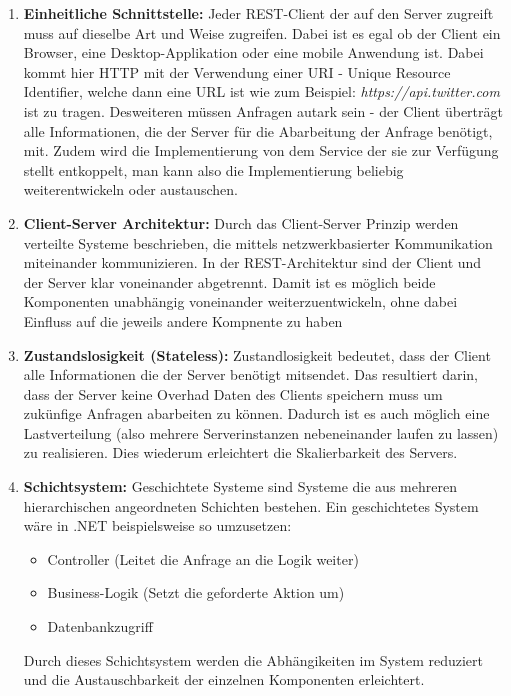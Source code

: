 \documentclass[bachelor, german ]{hgbthesis}
\begin{document}
\begin{enumerate}
    \item \textbf{Einheitliche Schnittstelle: }
    Jeder REST-Client der auf den Server zugreift muss auf dieselbe Art und Weise zugreifen.
    Dabei ist es egal ob der Client ein Browser, eine Desktop-Applikation oder eine mobile Anwendung ist.
    Dabei kommt hier HTTP mit der Verwendung einer URI - Unique Resource Identifier, welche dann eine URL ist wie zum Beispiel: \textit{https://api.twitter.com} ist zu tragen.
    Desweiteren müssen Anfragen autark sein - der Client überträgt alle Informationen, die der Server für die Abarbeitung der Anfrage benötigt, mit.
    Zudem wird die Implementierung von dem Service der sie zur Verfügung stellt entkoppelt, man kann also die Implementierung beliebig weiterentwickeln oder austauschen.
    \item \textbf{Client-Server Architektur: }
    Durch das Client-Server Prinzip werden verteilte Systeme beschrieben, die mittels netzwerkbasierter Kommunikation miteinander kommunizieren.
    In der REST-Architektur sind der Client und der Server klar voneinander abgetrennt.
    Damit ist es möglich beide Komponenten unabhängig voneinander weiterzuentwickeln, ohne dabei Einfluss auf die jeweils andere Kompnente zu haben
    \item \textbf{Zustandslosigkeit (Stateless): }
    Zustandlosigkeit bedeutet, dass der Client alle Informationen die der Server benötigt mitsendet.
    Das resultiert darin, dass der Server keine Overhad Daten des Clients speichern muss um zukünfige Anfragen abarbeiten zu können.
    Dadurch ist es auch möglich eine Lastverteilung (also mehrere Serverinstanzen nebeneinander laufen zu lassen) zu realisieren. Dies wiederum erleichtert die Skalierbarkeit des Servers.
    \item \textbf{Schichtsystem: }
    Geschichtete Systeme sind Systeme die aus mehreren hierarchischen angeordneten Schichten bestehen. Ein geschichtetes System wäre in .NET beispielsweise so umzusetzen:
    \begin{itemize}
        \item Controller (Leitet die Anfrage an die Logik weiter)
        \item Business-Logik (Setzt die geforderte Aktion um)
        \item Datenbankzugriff
    \end{itemize}
    Durch dieses Schichtsystem werden die Abhängikeiten im System reduziert und die Austauschbarkeit der einzelnen Komponenten erleichtert.

\end{enumerate}
\end{document}

